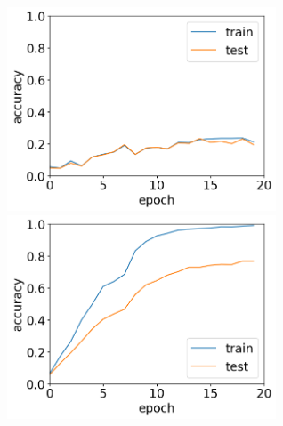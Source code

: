 \documentclass[11pt,a4paper,uplatex,draft]{ujarticle}
\begin{document}
  \begin{figure}[tbp]
    \begin{minipage}[b]{0.5\textwidth}
      \centering
      \includegraphics[keepaspectratio, width=80mm]{Images/python/acc_202402051931.png}
    \end{minipage}
    \begin{minipage}[b]{0.5\textwidth}
      \centering
      \includegraphics[keepaspectratio, width=80mm]{Images/python/acc_202402052150.png}
    \end{minipage}
  \end{figure}
\end{document}
